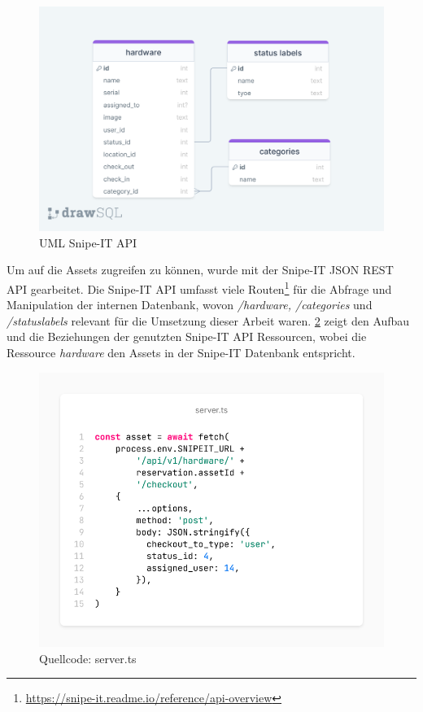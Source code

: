 \begin{figure}[h]
  \centering
  \includegraphics[scale=0.3]{Bilder/apisnipeit.png}
  \caption[UML Snipe-IT API]{UML Snipe-IT API}
  \label{fig:server}
\end{figure}

Um auf die Assets zugreifen zu können, wurde mit der Snipe-IT JSON REST API gearbeitet. Die Snipe-IT
API umfasst viele Routen\footnote{\url{https://snipe-it.readme.io/reference/api-overview}} für die
Abfrage und Manipulation der internen Datenbank, wovon \textit{/hardware, /categories} und
\textit{/statuslabels} relevant für die Umsetzung dieser Arbeit waren. \ref{fig:snipe} zeigt den
Aufbau und die Beziehungen der genutzten Snipe-IT API Ressourcen, wobei die Ressource
\textit{hardware} den Assets in der Snipe-IT Datenbank entspricht.

\begin{figure}[h]
  \centering
  \includegraphics[scale=0.4]{Bilder/screenshot(5).png}
  \caption[Quellcode: server.ts]{Quellcode: server.ts}
  \label{fig:snipe}
\end{figure}

